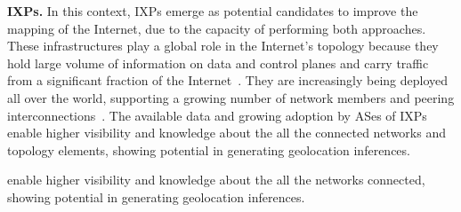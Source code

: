 
	\textbf{IXPs.} In this context, IXPs emerge as potential candidates to improve the mapping of the Internet, due to the capacity of performing both approaches. These infrastructures play a global role in the Internet’s topology because they hold large volume of information on data and control planes and carry traffic from a significant fraction of the Internet~\cite{Chatzis:2013:BUL:2504730.2504746}. They are increasingly being deployed all over the world, supporting a growing number of network members and peering interconnections~\cite{Giotsas:2017:DPI:3098822.3098855}. The available data and growing adoption by ASes of IXPs enable higher visibility and knowledge about the all the connected networks and topology elements, showing potential in generating geolocation inferences.

	enable higher visibility and knowledge about the all the networks connected, showing potential in generating geolocation inferences.
	


